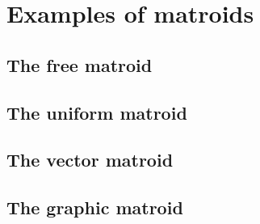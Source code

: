 \section{Examples of matroids}
\skelpar

\subsection*{The free matroid}
\skelpar

\subsection*{The uniform matroid}
\skelpar

\subsection*{The vector matroid}
\skelpars[2]

\subsection*{The graphic matroid}
\skelpars[3]